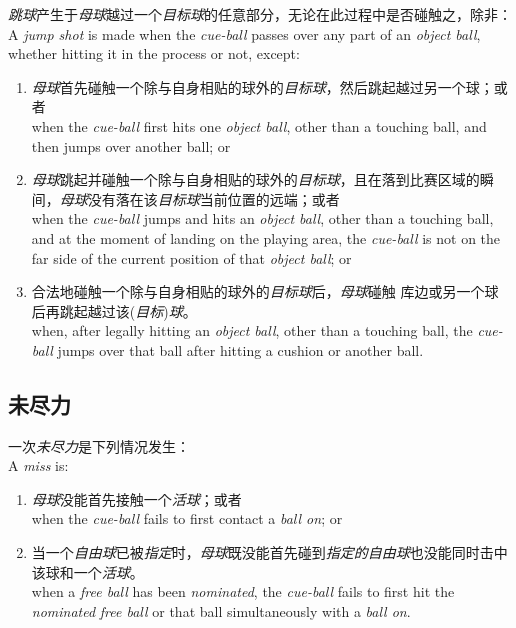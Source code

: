 \noindent \emph{跳球}产生于\emph{母球}越过一个\emph{目标球}的任意部分，无论在此过程中是否碰触之，除非：\\
A \emph{jump shot} is made when the \emph{cue-ball} passes over any part of an \emph{object ball}, whether hitting it in the process or not, except:
\begin{enumerate}[label=(\alph*)]
    \item \emph{母球}首先碰触一个除与自身相贴的球外的\emph{目标球}，然后跳起越过另一个球；或者\\
    when the \emph{cue-ball} first hits one \emph{object ball}, other than a touching ball, and then jumps over another ball; or
    \item \emph{母球}跳起并碰触一个除与自身相贴的球外的\emph{目标球}，且在落到比赛区域的瞬间，\emph{母球}没有落在该\emph{目标球}当前位置的远端；或者\\
    when the \emph{cue-ball} jumps and hits an \emph{object ball}, other than a touching ball, and at the moment of landing on the playing area, the \emph{cue-ball} is not on the far side of the current position of that \emph{object ball}; or
    \item 合法地碰触一个除与自身相贴的球外的\emph{目标球}后，\emph{母球}碰触
    库边或另一个球后再跳起越过该(\emph{目标})\emph{球}。\\
    when, after legally hitting an \emph{object ball}, other than a touching ball, the \emph{cue-ball} jumps over that ball after hitting a cushion or another ball.
\end{enumerate}

\subsection{未尽力}

\noindent 一次\emph{未尽力}是下列情况发生：\\
A \emph{miss} is:
\begin{enumerate}[label=(\alph*)]
    \item \emph{母球}没能首先接触一个\emph{活球}；或者\\
    when the \emph{cue-ball} fails to first contact a \emph{ball on}; or
    \item 当一个\emph{自由球}已被\emph{指定}时，\emph{母球}既没能首先碰到\emph{指定的}\emph{自由球}也没能同时击中该球和一个\emph{活球}。\\
    when a \emph{free ball} has been \emph{nominated}, the \emph{cue-ball} fails to first hit the \emph{nominated} \emph{free ball} or that ball simultaneously with a \emph{ball on}.
\end{enumerate}

